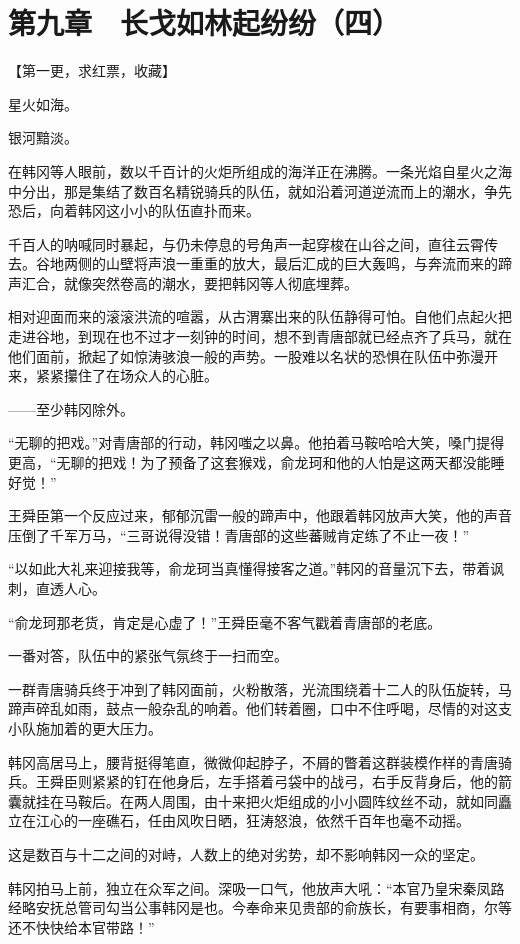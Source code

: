 \section{第九章　长戈如林起纷纷（四）}

【第一更，求红票，收藏】

星火如海。

银河黯淡。

在韩冈等人眼前，数以千百计的火炬所组成的海洋正在沸腾。一条光焰自星火之海中分出，那是集结了数百名精锐骑兵的队伍，就如沿着河道逆流而上的潮水，争先恐后，向着韩冈这小小的队伍直扑而来。

千百人的呐喊同时暴起，与仍未停息的号角声一起穿梭在山谷之间，直往云霄传去。谷地两侧的山壁将声浪一重重的放大，最后汇成的巨大轰鸣，与奔流而来的蹄声汇合，就像突然卷高的潮水，要把韩冈等人彻底埋葬。

相对迎面而来的滚滚洪流的喧嚣，从古渭寨出来的队伍静得可怕。自他们点起火把走进谷地，到现在也不过才一刻钟的时间，想不到青唐部就已经点齐了兵马，就在他们面前，掀起了如惊涛骇浪一般的声势。一股难以名状的恐惧在队伍中弥漫开来，紧紧攥住了在场众人的心脏。

——至少韩冈除外。

“无聊的把戏。”对青唐部的行动，韩冈嗤之以鼻。他拍着马鞍哈哈大笑，嗓门提得更高，“无聊的把戏！为了预备了这套猴戏，俞龙珂和他的人怕是这两天都没能睡好觉！”

王舜臣第一个反应过来，郁郁沉雷一般的蹄声中，他跟着韩冈放声大笑，他的声音压倒了千军万马，“三哥说得没错！青唐部的这些蕃贼肯定练了不止一夜！”

“以如此大礼来迎接我等，俞龙珂当真懂得接客之道。”韩冈的音量沉下去，带着讽刺，直透人心。

“俞龙珂那老货，肯定是心虚了！”王舜臣毫不客气戳着青唐部的老底。

一番对答，队伍中的紧张气氛终于一扫而空。

一群青唐骑兵终于冲到了韩冈面前，火粉散落，光流围绕着十二人的队伍旋转，马蹄声碎乱如雨，鼓点一般杂乱的响着。他们转着圈，口中不住呼喝，尽情的对这支小队施加着的更大压力。

韩冈高居马上，腰背挺得笔直，微微仰起脖子，不屑的瞥着这群装模作样的青唐骑兵。王舜臣则紧紧的钉在他身后，左手搭着弓袋中的战弓，右手反背身后，他的箭囊就挂在马鞍后。在两人周围，由十来把火炬组成的小小圆阵纹丝不动，就如同矗立在江心的一座礁石，任由风吹日晒，狂涛怒浪，依然千百年也毫不动摇。

这是数百与十二之间的对峙，人数上的绝对劣势，却不影响韩冈一众的坚定。

韩冈拍马上前，独立在众军之间。深吸一口气，他放声大吼：“本官乃皇宋秦凤路经略安抚总管司勾当公事韩冈是也。今奉命来见贵部的俞族长，有要事相商，尔等还不快快给本官带路！”

